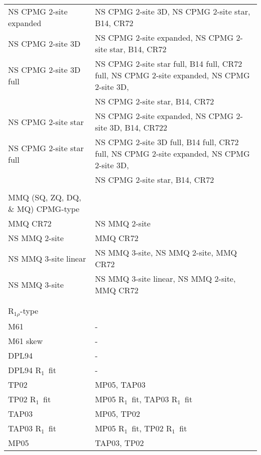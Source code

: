 \documentclass[a4paper,11pt,twoside,openright]{book}
\begin{document}
{\begin{landscape}
\begin{center}
\begin{small}
\begin{longtable}{ll}
NS CPMG 2-site expanded          & NS CPMG 2-site 3D, NS CPMG 2-site star, B14, CR72 \\
NS CPMG 2-site 3D                & NS CPMG 2-site expanded, NS CPMG 2-site star, B14, CR72 \\
NS CPMG 2-site 3D full           & NS CPMG 2-site star full, B14 full, CR72 full, NS CPMG 2-site expanded, NS CPMG 2-site 3D, \\
                                 & NS CPMG 2-site star, B14, CR72 \\
NS CPMG 2-site star              & NS CPMG 2-site expanded, NS CPMG 2-site 3D, B14, CR722 \\
NS CPMG 2-site star full         & NS CPMG 2-site 3D full, B14 full, CR72 full, NS CPMG 2-site expanded, NS CPMG 2-site 3D, \\
                                 & NS CPMG 2-site star, B14, CR72 \\
\par
\\[-5pt]
MMQ (SQ, ZQ, DQ, \& MQ) CPMG-type \\
\cline{1-1}
MMQ CR72                         & NS MMQ 2-site \\
NS MMQ 2-site                    & MMQ CR72 \\
NS MMQ 3-site linear             & NS MMQ 3-site, NS MMQ 2-site, MMQ CR72 \\
NS MMQ 3-site                    & NS MMQ 3-site linear, NS MMQ 2-site, MMQ CR72 \\
\par
\\
\\[-5pt]
$\mathrm{R}_{1\rho}$-type \\
\cline{1-1}
M61                              & - \\
M61 skew                         & - \\
DPL94                            & - \\
DPL94 $\mathrm{R}_1$\  fit                & - \\
TP02                             & MP05, TAP03 \\
TP02 $\mathrm{R}_1$\  fit                 & MP05 $\mathrm{R}_1$\  fit, TAP03 $\mathrm{R}_1$\  fit \\
TAP03                            & MP05, TP02 \\
TAP03 $\mathrm{R}_1$\  fit                & MP05 $\mathrm{R}_1$\  fit, TP02 $\mathrm{R}_1$\  fit \\
MP05                             & TAP03, TP02 \\

\end{longtable}
\end{small}
\end{center}
\end{landscape}}
\end{document}
